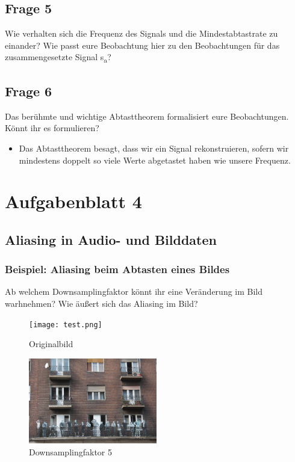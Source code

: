 \documentclass[a4paper, 11pt]{article}
\begin{document}
    \subsection{Frage 5}
    Wie verhalten sich die Frequenz des Signals und die Mindestabtastrate zu einander?
    Wie passt eure Beobachtung hier zu den Beobachtungen für das zusammengesetzte Signal s\textsubscript{a}?

    \subsection{Frage 6}
    Das berühmte und wichtige Abtasttheorem formalisiert eure Beobachtungen. Könnt ihr es formulieren?
    \begin{itemize}
    \item Das Abtasttheorem besagt, dass wir ein Signal rekonstruieren, sofern wir mindestens doppelt so viele Werte abgetastet haben wie unsere Frequenz.
    \end{itemize}
    
\section{Aufgabenblatt 4}

\subsection{Aliasing in Audio- und Bilddaten}

\subsubsection{Beispiel: Aliasing beim Abtasten eines Bildes}

Ab welchem Downsamplingfaktor könnt ihr eine Veränderung im Bild warhnehmen? Wie äußert sich das Aliasing im Bild?
    
\begin{figure}[h]
    \centering 
    \texttt{[image: test.png]}
    \caption{Originalbild}
    \label{fig : label5}
\end{figure}
    
\begin{figure}[h]
    \centering 
    \includegraphics[width =0.5\textwidth]{test_sliced5.png}        \caption{Downsamplingfaktor 5}
    \label{fig : label6} 
\end{figure}
    
\end{document}

